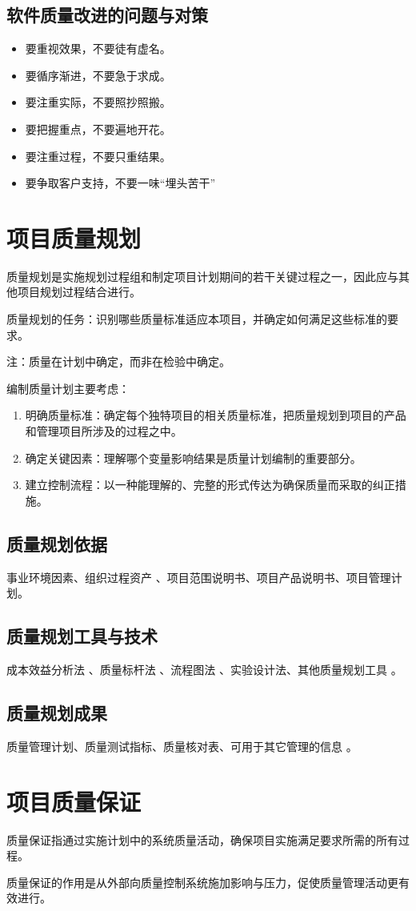\subsection{软件质量改进的问题与对策}
\begin{itemize}
	\item 要重视效果，不要徒有虚名。
	\item 要循序渐进，不要急于求成。
	\item 要注重实际，不要照抄照搬。
	\item 要把握重点，不要遍地开花。
	\item 要注重过程，不要只重结果。
	\item 要争取客户支持，不要一味“埋头苦干”
\end{itemize}
\section{项目质量规划}
质量规划是实施规划过程组和制定项目计划期间的若干关键过程之一，因此应与其他项目规划过程结合进行。
\par 质量规划的任务：识别哪些质量标准适应本项目，并确定如何满足这些标准的要求。
\par 注：质量在计划中确定，而非在检验中确定。
\par 编制质量计划主要考虑：
\begin{enumerate}
	\item 明确质量标准：确定每个独特项目的相关质量标准，把质量规划到项目的产品和管理项目所涉及的过程之中。
	\item 确定关键因素：理解哪个变量影响结果是质量计划编制的重要部分。 
	\item 建立控制流程：以一种能理解的、完整的形式传达为确保质量而采取的纠正措施。
\end{enumerate}
\subsection{质量规划依据}
事业环境因素、组织过程资产 、项目范围说明书、项目产品说明书、项目管理计划。
\subsection{质量规划工具与技术}
成本效益分析法 、质量标杆法 、流程图法 、实验设计法、其他质量规划工具 。
\subsection{质量规划成果}
质量管理计划、质量测试指标、质量核对表、可用于其它管理的信息 。
\section{项目质量保证}
质量保证指通过实施计划中的系统质量活动，确保项目实施满足要求所需的所有过程。
\par 质量保证的作用是从外部向质量控制系统施加影响与压力，促使质量管理活动更有效进行。
